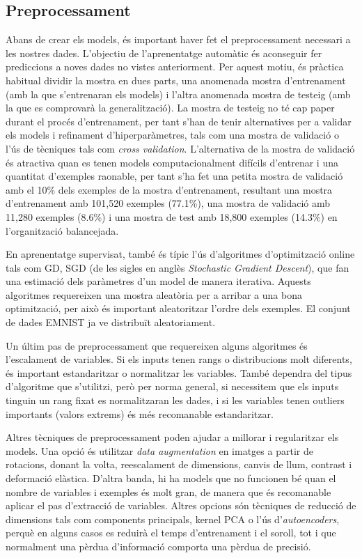 \documentclass[12pt, spanish]{article}
\begin{document}
\subsection{Preprocessament}

Abans de crear els models, és important haver fet el preprocessament necessari a les nostres dades. L'objectiu de l'aprenentatge automàtic és aconseguir fer prediccions a noves dades no vistes anteriorment. Per aquest motiu, és pràctica habitual dividir la mostra en dues parts, una anomenada mostra d'entrenament (amb la que s'entrenaran els models) i l'altra anomenada mostra de testeig (amb la que es comprovarà la generalització). La mostra de testeig no té cap paper durant el procés d'entrenament, per tant s'han de tenir alternatives per a validar els models i refinament d'hiperparàmetres, tals com una mostra de validació o l'ús de tècniques tals com \textit{cross validation}. L'alternativa de la mostra de validació és atractiva quan es tenen models computacionalment difícils d'entrenar i una quantitat d'exemples raonable, per tant s'ha fet una petita mostra de validació amb el 10\% dels exemples de la mostra d'entrenament, resultant una mostra d'entrenament amb 101,520 exemples (77.1\%), una mostra de validació amb 11,280 exemples (8.6\%) i una mostra de test amb 18,800 exemples (14.3\%) en l'organització balancejada.

En aprenentatge supervisat, també és típic l'ús d'algoritmes d'optimització online tals com GD, SGD (de les sigles en anglès \textit{Stochastic Gradient Descent}), que fan una estimació dels paràmetres d'un model de manera iterativa. Aquests algoritmes requereixen una mostra aleatòria per a arribar a una bona optimització, per això és important aleatoritzar l'ordre dels exemples. El conjunt de dades EMNIST ja ve distribuït aleatoriament. 

Un últim pas de preprocessament que requereixen alguns algoritmes és l'escalament de variables. Si els inputs tenen rangs o distribucions molt diferents, és important estandaritzar o normalitzar les variables. També dependra del tipus d'algoritme que s'utilitzi, però per norma general, si necessitem que els inputs tinguin un rang fixat es normalitzaran les dades, i si les variables tenen outliers importants (valors extrems) és més recomanable estandaritzar.

Altres tècniques de preprocessament poden ajudar a millorar i regularitzar els models. Una opció és utilitzar \textit{data augmentation} en imatges a partir de rotacions, donant la volta, reescalament de dimensions, canvis de llum, contrast i deformació elàstica. D'altra banda, hi ha models que no funcionen bé quan el nombre de variables i exemples és molt gran, de manera que és recomanable aplicar el pas d'extracció de variables. Altres opcions són tècniques de reducció de dimensions tals com components principals, kernel PCA o l'ús d'\textit{autoencoders}, perquè en alguns casos es reduirà el temps d'entrenament i el soroll, tot i que normalment una pèrdua d'informació comporta una pèrdua de precisió.
\end{document}
